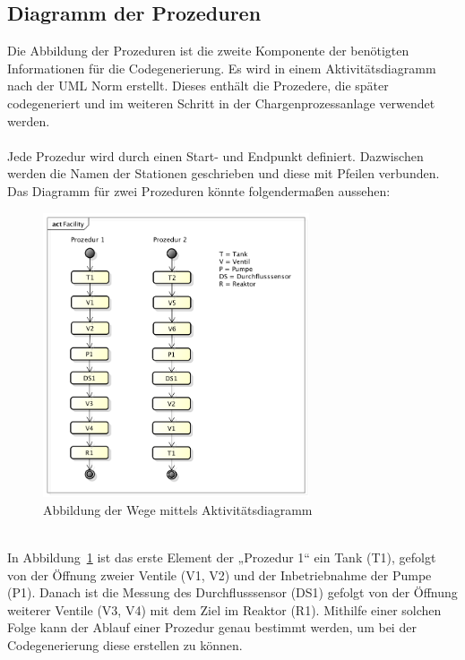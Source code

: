 
\subsection{Diagramm der Prozeduren}
Die Abbildung der Prozeduren ist die zweite Komponente der benötigten Informationen für die Codegenerierung. Es wird in einem Aktivitätsdiagramm nach der \ac{UML} Norm erstellt. Dieses enthält die Prozedere, die später codegeneriert und im weiteren Schritt in der Chargenprozessanlage verwendet werden. \\\\
Jede Prozedur wird durch einen Start- und Endpunkt definiert. Dazwischen werden die Namen der Stationen geschrieben und diese mit Pfeilen verbunden. Das Diagramm für zwei Prozeduren könnte folgendermaßen aussehen: 
\begin{figure}[h!]
		\centering
		\includegraphics[width=0.7\textwidth]{graphics/konzept/UML_Activity.png}
		\caption{Abbildung der Wege mittels Aktivitätsdiagramm}
		\label{fig:konz_UML_Activity}
\end{figure}\\
In Abbildung~\ref{fig:konz_UML_Activity} ist das erste Element der „Prozedur 1“ ein Tank (T1), gefolgt von der Öffnung zweier Ventile (V1, V2) und der Inbetriebnahme der Pumpe (P1). Danach ist die Messung des Durchflusssensor (DS1) gefolgt von der Öffnung weiterer Ventile (V3, V4) mit dem Ziel im Reaktor (R1). 
Mithilfe einer solchen Folge kann der Ablauf einer Prozedur genau bestimmt werden, um bei der Codegenerierung diese erstellen zu können. 

